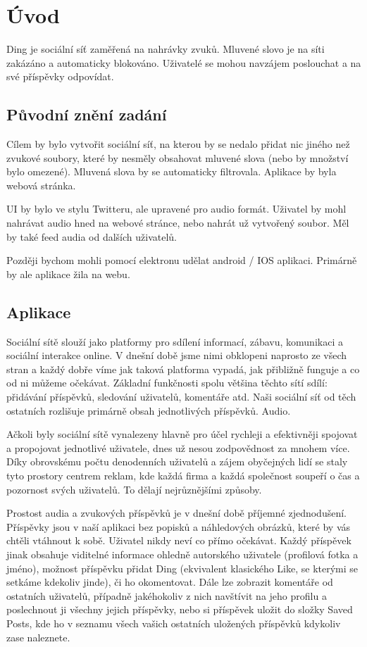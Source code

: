 \section{Úvod}
Ding je sociální síť zaměřená na nahrávky zvuků. Mluvené slovo je na síti zakázáno
a automaticky blokováno. Uživatelé se mohou navzájem poslouchat a na své příspěvky
odpovídat.

\subsection{Původní znění zadání}
Cílem by bylo vytvořit sociální síť, na kterou by se nedalo přidat nic jiného
než zvukové soubory, které by nesměly obsahovat mluvené slova (nebo by množství
bylo omezené). Mluvená slova by se automaticky filtrovala. Aplikace by byla
webová stránka.

UI by bylo ve stylu Twitteru, ale upravené pro audio formát. Uživatel by mohl
nahrávat audio hned na webové stránce, nebo nahrát už vytvořený soubor. Měl by
také feed audia od dalších uživatelů.

Později bychom mohli pomocí elektronu udělat android / IOS aplikaci. Primárně
by ale aplikace žila na webu. 

\subsection{Aplikace}
Sociální sítě slouží jako platformy pro sdílení informací, zábavu, komunikaci
a sociální interakce online. V dnešní době jsme nimi obklopeni naprosto ze všech
stran a každý dobře víme jak taková platforma vypadá, jak přibližně funguje a co
od ni můžeme očekávat. Základní funkčnosti spolu většina těchto sítí sdílí:
přidávání příspěvků, sledování uživatelů, komentáře atd. Naši sociální síť 
od těch ostatních rozlišuje primárně obsah jednotlivých příspěvků. Audio.

Ačkoli byly sociální sítě vynalezeny hlavně pro účel rychleji a efektivněji
spojovat a propojovat jednotlivé uživatele, dnes už nesou zodpovědnost za 
mnohem více. Díky obrovskému počtu denodenních uživatelů a zájem obyčejných
lidí se staly tyto prostory centrem reklam, kde každá firma a každá společnost
soupeří o čas a pozornost svých uživatelů. To dělají nejrůznějšími způsoby.

Prostost audia a zvukových příspěvků je v dnešní době příjemné zjednodušení.
Příspěvky jsou v naší aplikaci bez popisků a náhledových obrázků, které by
vás chtěli vtáhnout k sobě. Uživatel nikdy neví co přímo očekávat.
Každý příspěvek jinak obsahuje viditelné informace ohledně autorského
uživatele (profilová fotka a jméno), možnost příspěvku přidat Ding (ekvivalent
klasického Like, se kterými se setkáme kdekoliv jinde), či ho okomentovat.
Dále lze zobrazit komentáře od ostatních uživatelů, případně jakéhokoliv z nich
navštívit na jeho profilu a poslechnout ji všechny jejich příspěvky, nebo si 
příspěvek uložit do složky Saved Posts, kde ho v seznamu všech vašich ostatních 
uložených příspěvků kdykoliv zase naleznete.

\newpage
